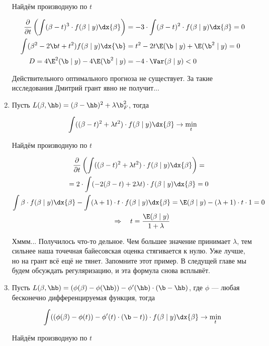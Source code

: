 \begin{problem}
\begin{sol}
\begin{enumerate}
Найдём производную по $t$

\begin{align*}
\frac{\partial }{\partial t} \left(  \int (\beta - t)^3 \cdot f(\beta \mid y) \dx{\beta}   \right) &= - 3 \cdot \int (\beta - t)^2 \cdot f(\beta \mid y) \dx{\beta} = 0 \\ 
\int (\beta^2 - 2\b t + t^2) f(\beta \mid y) \dx{\b} &= t^2 - 2t \E(\b \mid y) + \E(\b^2 \mid y) = 0\\
D = 4 \E^2(\b \mid y) - 4 \E(\b^2 \mid y) &= - 4 \cdot\Var(\beta \mid y) < 0 
\end{align*}

Действительного оптимального прогноза не существует. За такие исследования Дмитрий грант явно не получит...

\item Пусть $L(\beta, \hb) = (\beta - \hb)^2 + \lambda \b_F^2$, тогда 

\[ \int ((\beta - t)^2 + \lambda t^2) \cdot f(\beta \mid y) \dx{\beta} \to \min_{t} \] 

Найдём производную по $t$

\begin{multline*}
\frac{\partial }{\partial t} \left(  \int ((\beta - t)^2 + \lambda t^2) \cdot f(\beta \mid y) \dx{\beta}   \right) = \\ =  2 \cdot \int (-2(\beta - t) + 2 \lambda t) \cdot f(\beta \mid y) \dx{\beta} = 0 \\ 
\int \beta \cdot f(\beta \mid y) \dx{\beta} - \int (\lambda + 1) \cdot t \cdot f(\beta \mid y) \dx{\beta} = \E(\beta \mid y) - (\lambda + 1) \cdot t \cdot 1 =  0 \\ \quad \Rightarrow \quad t = \frac{\E(\beta \mid y)}{1 + \lambda}  
\end{multline*}

Хммм... Получилось что-то дельное. Чем большее значение принимает $\lambda$, тем сильнее наша точечная байесовская оценка стягивается к нулю. Уже лучше, но на грант всё ещё не тянет.  Запомните этот пример. В следущей главе мы будем обсуждать регуляризацию, и эта формула снова всплывёт. 

\item Пусть $L(\beta, \hb) = (\phi(\beta) - \phi(\hb)) - \phi'(\hb) \cdot(\b - \hb) $, где $\phi$ --- любая бесконечно дифференцируемая функция, тогда 

\[ \int ((\phi(\beta) - \phi(t)) - \phi'(t) \cdot(\b - t) )\cdot f(\beta \mid y) \dx{\beta} \to \min_{t} \] 

Найдём производную по $t$


\end{enumerate}
\end{sol}
\end{problem}
